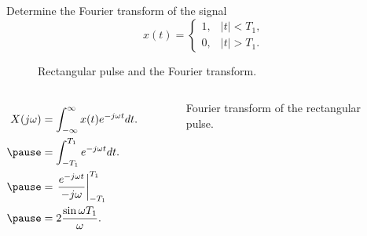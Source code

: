 \begin{frame}
    \begin{example}
        Determine the Fourier transform of the signal
        \begin{equation*}
            x(t) = \begin{cases}
                1,& |t| < T_1,\\
                0, & |t| > T_1.
            \end{cases}
        \end{equation*}
    \end{example}
    \pause
    {
        \begin{figure}
          \centering
          
          \caption{Rectangular pulse and the Fourier transform.}\label{fi:square_pulse}
        \end{figure}
    }
\end{frame}

\begin{frame}
    {
        \begin{columns}
                \begin{equation*}
                    \begin{aligned}
                        X(j\omega) &= \int_{-\infty}^{\infty}x(t)e^{-j\omega t} dt.\\ \pause
                        &= \int_{-T_1}^{T_1} e^{-j\omega t} dt.\\ \pause
                        &= \left.\frac{e^{-j\omega t}}{-j\omega}\right|_{-T_1}^{T_1} \\ \pause
                        &= 2\frac{\sin \omega T_1}{\omega}.\\
                    \end{aligned}
                \end{equation*}
                \pause
                \begin{figure}
                  \centering
                  
                  \caption{Fourier transform of the rectangular pulse.}\label{fi:square_pulse_ft}
                \end{figure}
        \end{columns}
    }


\end{frame}


